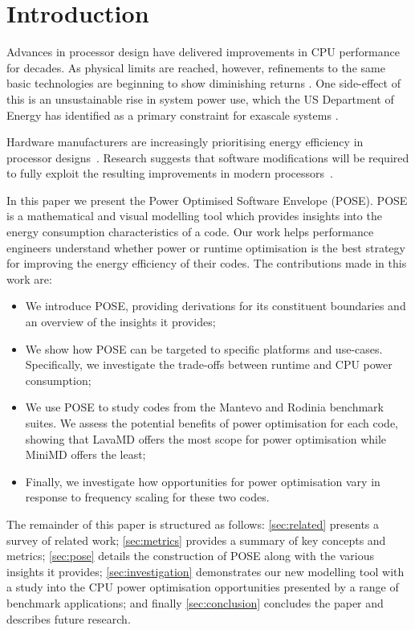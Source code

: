\section{Introduction} \noindent
Advances in processor design have delivered improvements in CPU performance for decades. As physical limits are reached, however, refinements to the same basic technologies are beginning to show diminishing returns \cite{esmaeilzadeh:2011aa}. 
One side-effect of this is an unsustainable rise in system power use, which the US Department of Energy has identified as a primary constraint for exascale systems \cite{shalf:2011aa}.

Hardware manufacturers are increasingly prioritising energy efficiency in processor designs~\cite{kurd:2014aa}. 
Research suggests that software modifications will be required to fully exploit the resulting improvements in modern processors~\cite{shao:2013aa}.

In this paper we present the Power Optimised Software Envelope (POSE).
POSE is a mathematical and visual modelling tool which provides insights into the energy consumption characteristics of a code.
Our work helps performance engineers understand whether power or runtime optimisation is the best strategy for improving the energy efficiency of their codes.
The contributions made in this work are:
\begin{itemize}
  \item We introduce POSE, providing derivations for its constituent boundaries and an overview of the insights it provides;
  \item We show how POSE can be targeted to specific platforms and use-cases. 
        Specifically, we investigate the trade-offs between runtime and CPU power consumption;
  \item We use POSE to study codes from the Mantevo and Rodinia benchmark suites.
        We assess the potential benefits of power optimisation for each code, showing that LavaMD offers the most scope for power optimisation while MiniMD offers the least;
  \item Finally, we investigate how opportunities for power optimisation vary in response to frequency scaling for these two codes.
\end{itemize}

The remainder of this paper is structured as follows:
\autoref{sec:related} presents a survey of related work; 
\autoref{sec:metrics} provides a summary of key concepts and metrics;
\autoref{sec:pose} details the construction of POSE along with the various insights it provides;
\autoref{sec:investigation} demonstrates our new modelling tool with a study into the CPU power optimisation opportunities presented by a range of benchmark applications;
and finally \autoref{sec:conclusion} concludes the paper and describes future research.
